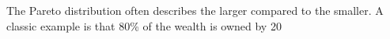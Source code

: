 \begin{frame}
\begin{itemize}
The Pareto distribution often 
describes the larger compared
 to the smaller. 
A classic example is that 
80\% of the wealth is owned by 20%

\end{itemize}
\end{frame}

